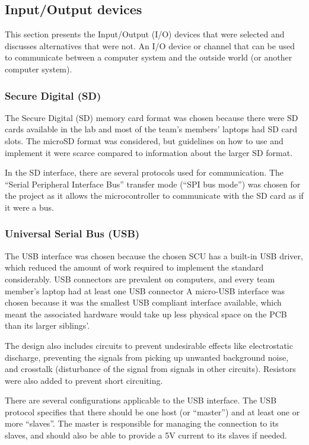 \subsection{Input/Output devices} \label{pcb:design-choices:ss:IO_devices}
This section presents the Input/Output (I/O) devices that were selected and discusses alternatives that were not.
An I/O device or channel that can be used to communicate between a computer system and the outside world (or another computer system).

\subsubsection{Secure Digital (SD)} 
The Secure Digital (SD) memory card format was chosen because there were SD cards available in the lab and most of the team's members' laptops had SD card slots.
The microSD format was considered, but guidelines on how to use and implement it were scarce compared to information about the larger SD format.

In the SD interface, there are several protocols used for communication. 
The ``Serial Peripheral Interface Bus'' transfer mode (``SPI bus mode'') was chosen for the project as it allows the microcontroller to communicate with the SD card as if it were a bus.


\subsubsection{Universal Serial Bus (USB)}
The USB interface was chosen because the chosen SCU has a built-in USB driver, which reduced the amount of work required to implement the standard considerably.
USB connectors are prevalent on computers, and every team member's laptop had at least one USB connector
A micro-USB interface was chosen because it was the smallest USB compliant interface available, which meant the associated hardware would take up less physical space on the PCB than its larger siblings'.

The design also includes circuits to prevent undesirable effects like electrostatic discharge, preventing the signals from picking up unwanted background noise, and crosstalk (disturbance of the signal from signals in other circuits).
Resistors were also added to prevent short circuiting.

There are several configurations applicable to the USB interface.
The USB protocol specifies that there should be one host (or ``master'') and at least one or more ``slaves''.
The master is responsible for managing the connection to its slaves, and should also be able to provide a 5V current to its slaves if needed.

